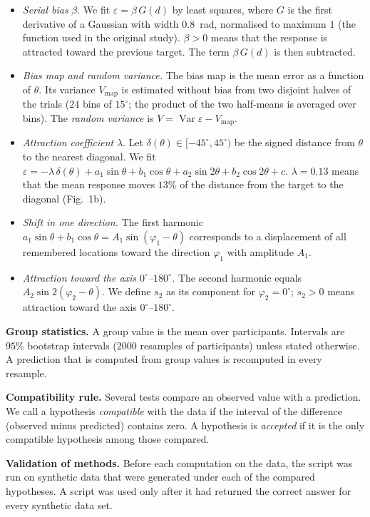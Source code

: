 \documentclass[10pt,a4paper]{article}
\newcommand{\dg}{^{\circ}}
\begin{document}
\begin{itemize}
\item \emph{Serial bias} $\beta$. We fit $\varepsilon=\beta\,G(d)$ by least squares, where $G$ is the first
derivative of a Gaussian with width $0.8$~rad, normalised to maximum $1$ (the function used in the original
study). $\beta>0$ means that the response is attracted toward the previous target. The term $\beta\,G(d)$ is
then subtracted.
\item \emph{Bias map and random variance.} The bias map is the mean error as a function of $\theta$. Its
variance $V_{\mathrm{map}}$ is estimated without bias from two disjoint halves of the trials ($24$ bins of
$15\dg$; the product of the two half-means is averaged over bins). The \emph{random variance} is
$V=\operatorname{Var}\varepsilon-V_{\mathrm{map}}$.
\item \emph{Attraction coefficient} $\lambda$. Let $\delta(\theta)\in[-45\dg,45\dg)$ be the signed distance
from $\theta$ to the nearest diagonal. We fit
$\varepsilon=-\lambda\,\delta(\theta)+a_1\sin\theta+b_1\cos\theta+a_2\sin2\theta+b_2\cos2\theta+c$.
$\lambda=0.13$ means that the mean response moves $13\%$ of the distance from the target to the diagonal
(Fig.~1b).
\item \emph{Shift in one direction.} The first harmonic $a_1\sin\theta+b_1\cos\theta=A_1\sin(\varphi_1-\theta)$
corresponds to a displacement of all remembered locations toward the direction $\varphi_1$ with amplitude
$A_1$.
\item \emph{Attraction toward the axis $0\dg$--$180\dg$.} The second harmonic equals $A_2\sin2(\varphi_2-\theta)$.
We define $s_2$ as its component for $\varphi_2=0\dg$; $s_2>0$ means attraction toward the axis
$0\dg$--$180\dg$.
\end{itemize}

\textbf{Group statistics.} A group value is the mean over participants. Intervals are $95\%$ bootstrap
intervals ($2000$ resamples of participants) unless stated otherwise. A prediction that is computed from group
values is recomputed in every resample.

\textbf{Compatibility rule.} Several tests compare an observed value with a prediction. We call a hypothesis
\emph{compatible} with the data if the interval of the difference (observed minus predicted) contains zero.
A hypothesis is \emph{accepted} if it is the only compatible hypothesis among those compared.

\textbf{Validation of methods.} Before each computation on the data, the script was run on synthetic data
that were generated under each of the compared hypotheses. A script was used only after it had returned the
correct answer for every synthetic data set.
\end{document}

